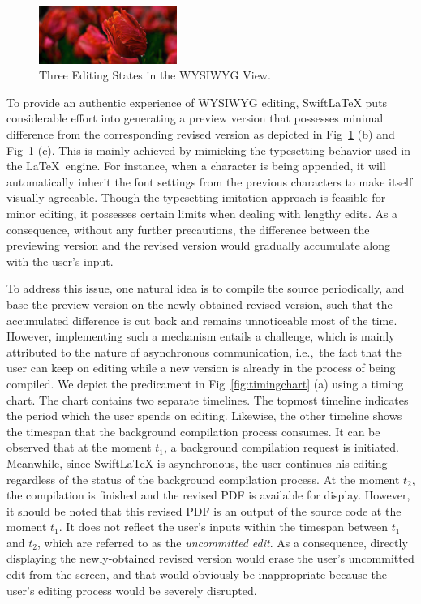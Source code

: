 \documentclass[sigconf]{acmart}
\newcommand{\ie}{i.e.,\ }
\begin{document}
\begin{figure}[t]
\begin{center}
\includegraphics[width=0.40\textwidth]{figure/download}
\caption{Three Editing States in the WYSIWYG View.}
\label{fig:editingexample}
\end{center}
\end{figure}

To provide an authentic experience of WYSIWYG editing, SwiftLaTeX puts considerable effort into generating a preview version that possesses minimal difference from the corresponding revised version as depicted in Fig~\ref{fig:editingexample} (b) and Fig~\ref{fig:editingexample} (c).
This is mainly achieved by mimicking the typesetting behavior used in the \LaTeX\ engine. 
For instance, when a character is being appended, it will automatically inherit the font settings from the previous characters to make itself visually agreeable.
Though the typesetting imitation approach is feasible for minor editing, it possesses certain limits when dealing with lengthy edits.
As a consequence, without any further precautions, the difference between the previewing version and the revised version would gradually accumulate along with the user's input.

To address this issue, one natural idea is to  compile the source periodically, and base the preview version on the newly-obtained revised version, such that the accumulated difference is cut back and remains unnoticeable most of the time. However, implementing such a mechanism entails a challenge, which is mainly attributed to the nature of asynchronous communication, \ie the fact that the user can keep on editing while a new version is already in the process of being compiled. 
We depict the predicament in Fig~\ref{fig:timingchart} (a) using a timing chart.
The chart contains two separate timelines. 
The topmost timeline indicates the period which the user spends on editing.
Likewise, the other timeline shows the timespan that the background compilation process consumes.
It can be observed that at the moment $t_1$, a background compilation request is initiated.
Meanwhile, since SwiftLaTeX is asynchronous, the user continues his editing regardless of the status of the background compilation process.
At the moment $t_2$, the compilation is finished and the revised PDF is available for display.
However, it should be noted that this revised PDF is an output of the source code at the moment $t_1$. 
It does not reflect the user's inputs within the timespan between $t_1$ and $t_2$, which are referred to as the \textit{uncommitted edit}.
As a consequence, directly displaying the newly-obtained revised version would erase the user's uncommitted edit  from the screen, and that would  obviously be inappropriate because the user's editing process would be severely disrupted.
\end{document}
